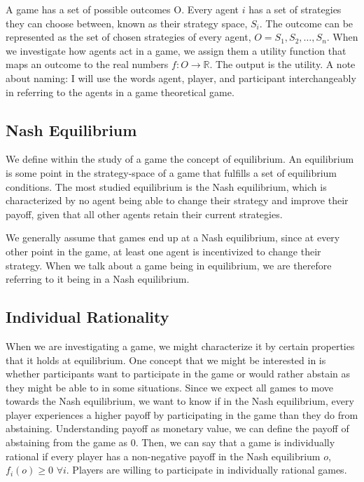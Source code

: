 A game has a set of possible outcomes O. Every agent $i$ has a set of
strategies they can choose between, known as their strategy space, $S_i$. The
outcome can be represented as the set of chosen strategies of every agent, $O =
{S_1,S_2,\dots,S_n}$. When we investigate how agents act in a game, we assign
them a utility function that maps an outcome to the real numbers $f: O
\rightarrow \mathbb R$. The output is the utility. A note about naming: I will
use the words agent, player, and participant interchangeably in referring to
the agents in a game theoretical game.

\subsection{Nash Equilibrium}
We define within the study of a game the concept of equilibrium. An equilibrium
is some point in the strategy-space of a game that fulfills a set of
equilibrium conditions. The most studied equilibrium is the Nash equilibrium,
which is characterized by no agent being able to change their strategy and
improve their payoff, given that all other agents retain their current
strategies.


We generally assume that games end up at a Nash equilibrium, since at every
other point in the game, at least one agent is incentivized to change their
strategy. When we talk about a game being in equilibrium, we are therefore
referring to it being in a Nash equilibrium.


\subsection{Individual Rationality}

When we are investigating a game, we might characterize it by certain
properties that it holds at equilibrium. One concept that we might be
interested in is whether participants want to participate in the game or would
rather abstain as they might be able to in some situations. Since we expect all
games to move towards the Nash equilibrium, we want to know if in the Nash
equilibrium, every player experiences a higher payoff by participating in the
game than they do from abstaining. Understanding payoff as monetary value, we
can define the payoff of abstaining from the game as 0. Then, we can say that a
game is individually rational if every player has a non-negative payoff in the
Nash equilibrium $o$, $f_i(o) \geq 0 \,\, \forall i$. Players are willing to
participate in individually rational games.

